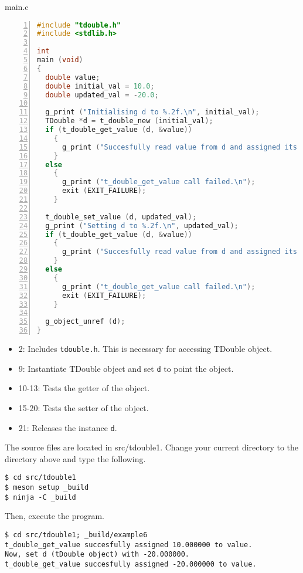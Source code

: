 main.c

\begin{lstlisting}[language=C, numbers=left]
#include "tdouble.h"
#include <stdlib.h>

int
main (void)
{
  double value;
  double initial_val = 10.0;
  double updated_val = -20.0;

  g_print ("Initialising d to %.2f.\n", initial_val);
  TDouble *d = t_double_new (initial_val);
  if (t_double_get_value (d, &value))
    {
      g_print ("Succesfully read value from d and assigned its value %.2f to another variable.\n", value);
    }
  else
    {
      g_print ("t_double_get_value call failed.\n");
      exit (EXIT_FAILURE);
    }

  t_double_set_value (d, updated_val);
  g_print ("Setting d to %.2f.\n", updated_val);
  if (t_double_get_value (d, &value))
    {
      g_print ("Succesfully read value from d and assigned its value %.2f to another variable.\n", value);
    }
  else
    {
      g_print ("t_double_get_value call failed.\n");
      exit (EXIT_FAILURE);
    }

  g_object_unref (d);
}
\end{lstlisting}

\begin{itemize}
\tightlist
\item
  2: Includes \passthrough{\lstinline!tdouble.h!}. This is necessary for
  accessing TDouble object.
\item
  9: Instantiate TDouble object and set \passthrough{\lstinline!d!} to
  point the object.
\item
  10-13: Tests the getter of the object.
\item
  15-20: Tests the setter of the object.
\item
  21: Releases the instance \passthrough{\lstinline!d!}.
\end{itemize}

The source files are located in src/tdouble1. Change your current
directory to the directory above and type the following.

\begin{lstlisting}
$ cd src/tdouble1
$ meson setup _build
$ ninja -C _build
\end{lstlisting}

Then, execute the program.

\begin{lstlisting}
$ cd src/tdouble1; _build/example6
t_double_get_value succesfully assigned 10.000000 to value.
Now, set d (tDouble object) with -20.000000.
t_double_get_value succesfully assigned -20.000000 to value.
\end{lstlisting}

